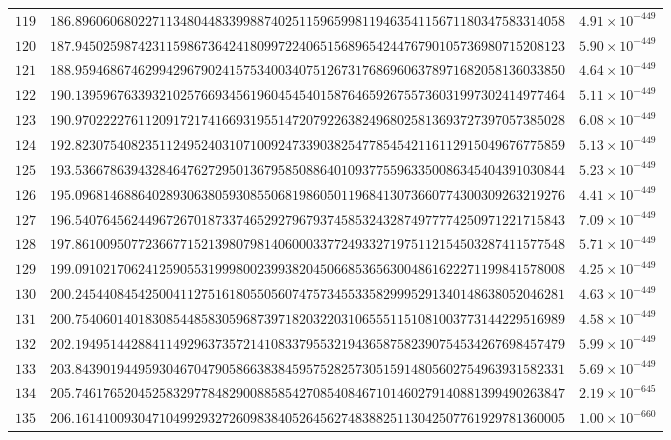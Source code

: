 \documentclass[12pt,reqno]{amsart}
\theoremstyle{plain}
\theoremstyle{definition}
\theoremstyle{remark}
\begin{document}
\begin{longtable}{clc}
$119$ & $186.8960606802271134804483399887402511596599811946354115671180347583314058$ & $4.91 \times 10^{-449}$ \\
$120$ & $187.9450259874231159867364241809972240651568965424476790105736980715208123$ & $5.90 \times 10^{-449}$ \\
$121$ & $188.9594686746299429679024157534003407512673176869606378971682058136033850$ & $4.64 \times 10^{-449}$ \\
$122$ & $190.1395967633932102576693456196045454015876465926755736031997302414977464$ & $5.11 \times 10^{-449}$ \\
$123$ & $190.9702222761120917217416693195514720792263824968025813693727397057385028$ & $6.08 \times 10^{-449}$ \\
$124$ & $192.8230754082351124952403107100924733903825477854542116112915049676775859$ & $5.13 \times 10^{-449}$ \\
$125$ & $193.5366786394328464762729501367958508864010937755963350086345404391030844$ & $5.23 \times 10^{-449}$ \\
$126$ & $195.0968146886402893063805930855068198605011968413073660774300309263219276$ & $4.41 \times 10^{-449}$ \\
$127$ & $196.5407645624496726701873374652927967937458532432874977774250971221715843$ & $7.09 \times 10^{-449}$ \\
$128$ & $197.8610095077236677152139807981406000337724933271975112154503287411577548$ & $5.71 \times 10^{-449}$ \\
$129$ & $199.0910217062412590553199980023993820450668536563004861622271199841578008$ & $4.25 \times 10^{-449}$ \\
$130$ & $200.2454408454250041127516180550560747573455335829995291340148638052046281$ & $4.63 \times 10^{-449}$ \\
$131$ & $200.7540601401830854485830596873971820322031065551151081003773144229516989$ & $4.58 \times 10^{-449}$ \\
$132$ & $202.1949514428841149296373572141083379553219436587582390754534267698457479$ & $5.99 \times 10^{-449}$ \\
$133$ & $203.8439019449593046704790586638384595752825730515914805602754963931582331$ & $5.69 \times 10^{-449}$ \\
$134$ & $205.7461765204525832977848290088585427085408467101460279140881399490263847$ & $2.19 \times 10^{-645}$ \\
$135$ & $206.1614100930471049929327260983840526456274838825113042507761929781360005$ & $1.00 \times 10^{-660}$ \\

\end{longtable}
\end{document}
